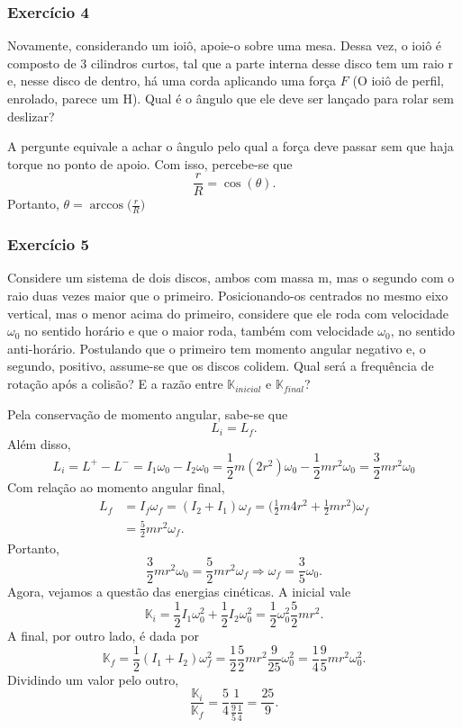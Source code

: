 \documentclass{article}
\begin{document}
\subsubsection{Exercício 4}
  Novamente, considerando um ioiô, apoie-o sobre uma mesa. Dessa vez, o ioiô é composto de 3 cilindros curtos, tal que a parte interna desse disco tem um raio r e,
nesse disco de dentro, há uma corda aplicando uma força \(F\) (O ioiô de perfil, enrolado, parece um H). Qual é o ângulo que ele deve ser lançado para rolar
sem deslizar?

  A pergunte equivale a achar o ângulo pelo qual a força deve passar sem que haja torque no ponto de apoio. Com isso, percebe-se que 
    \[
      \frac{r}{R} = \cos{(\theta )}.
    \]
    Portanto, \(\theta = \arccos{\biggl(\frac{r}{R}\biggr)}\)
\subsubsection{Exercício 5}
  Considere um sistema de dois discos, ambos com massa m, mas o segundo com o raio duas vezes maior que o primeiro. Posicionando-os centrados no mesmo eixo vertical, mas
o menor acima do primeiro, considere que ele roda com velocidade \(\omega_{0}\) no sentido horário e que o maior roda, também com velocidade \(\omega_{0}\), no sentido anti-horário. 
Postulando que o primeiro tem momento angular negativo e, o segundo, positivo, assume-se que os discos colidem. Qual será a frequência de rotação após a colisão?
E a razão entre \(\mathbb{K}_{inicial}\) e \(\mathbb{K}_{final}\)?

  Pela conservação de momento angular, sabe-se que 
    \[
      L_{i} = L_{f}.
    \]
  Além disso, 
  \[
  L_{i} = L^{+}-L^{-} = I_{1}\omega_{0} - I_{2}\omega_{0} = \frac{1}{2}m(2r^{2})\omega_{0} - \frac{1}{2}mr^{2}\omega_{0} = \frac{3}{2}mr^{2}\omega_{0}
  \]
  Com relação ao momento angular final, 
 \begin{align*}
   L_{f} &= I_{f}\omega_{f} = (I_{2} + I_{1})\omega_{f} = \biggl(\frac{1}{2}m4r^{2}+\frac{1}{2}mr^{2}\biggr)\omega_{f}\\
         &=\frac{5}{2}mr^{2}\omega_{f}.
 \end{align*}
 Portanto, 
   \[
     \frac{3}{2}mr^{2}\omega_{0} = \frac{5}{2}mr^{2}\omega_{f} \Rightarrow \omega_{f}=\frac{3}{5}\omega_{0}.
   \]
  Agora, vejamos a questão das energias cinéticas. A inicial vale 
    \[
      \mathbb{K}_{i} = \frac{1}{2}I_{1}\omega_{0}^{2} + \frac{1}{2}I_{2}\omega_{0}^{2} = \frac{1}{2}\omega_{0}^{2}\frac{5}{2}mr^{2}. 
    \]
  A final, por outro lado, é dada por 
    \[
      \mathbb{K}_{f} = \frac{1}{2}(I_{1}+I_{2})\omega_{f}^{2} = \frac{1}{2}\frac{5}{2}mr^{2}\frac{9}{25}\omega_{0}^{2} = \frac{1}{4}\frac{9}{5}mr^{2}\omega_{0}^{2}.
    \]
  Dividindo um valor pelo outro, 
    \[
      \frac{\mathbb{K}_{i}}{\mathbb{K}_{f}} = \frac{5}{4}\frac{1}{\frac{9}{5}\frac{1}{4}} = \frac{25}{9}.
    \]
\end{document}
